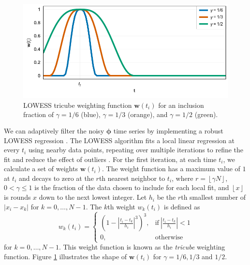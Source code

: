 \begin{figure}
	\centering
	\includegraphics[width=.99\textwidth]{figures/chapter5-lowess/figure1-window.pdf}
	\caption[LOWESS tricube weighting function]{
		LOWESS tricube weighting function $ \bm{w}(t_i) $ for an inclusion fraction of $ \gamma = 1/6 $ (blue), $ \gamma = 1/3 $ (orange), and $ \gamma = 1/2 $ (green).
	}
	\label{fig:ch5-algo-window}
\end{figure}


We can adaptively filter the noisy $ \bm{\phi} $ time series by implementing a robust LOWESS regression \citep{Cleveland1979RobustLocallyWeighted}. The LOWESS algorithm fits a local linear regression at every $t_i$ using nearby data points, repeating over multiple iterations to refine the fit and reduce the effect of outliers \citep{Efron2019ComputerAgeStatistical}.
For the first iteration, at each time $t_i$,  we calculate a set of weights $\bm{w}(t_i)$. The weight function has a maximum value of $1$ at $t_i$ and decays to zero at the $r$th nearest neighbor to $t_i$, where $r = \left\lfloor \gamma N \right\rfloor$, $0 < \gamma \leq 1$ is the fraction of the data chosen to include for each local fit, and $ \left\lfloor x \right\rfloor $ is rounds $ x $ down to the next lowest integer.
Let $h_i$ be the $r$th smallest number of $\left| x_i - x_k \right|$ for $ k = 0, \ldots, N-1 $.
The $k$th weight $w_k(t_i)$ is defined as
\begin{equation}
	w_k(t_i) = 
	\begin{cases}
		\left( 1 - \left|\frac{t_i - t_k}{h_i} \right|^3 \right)^3 , & \text{if}\  \left|\frac{t_i - t_k}{h_i} \right| < 1 \\
		0, & \text{otherwise}
	\end{cases}          \label{eq:ch5-lowess-weights}
\end{equation}
for $k =0, \ldots, N-1 $. This weight function is known as the \emph{tricube} weighting function.
Figure \ref{fig:ch5-algo-window} illustrates the shape of  $ \bm{w}(t_i) $ for $\gamma = 1/6, 1/3$ and  $1/2 $.



